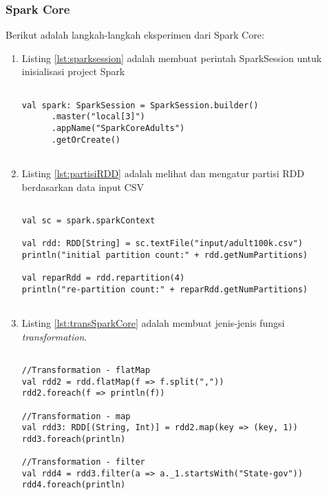 \subsubsection{Spark Core}
\noindent Berikut adalah langkah-langkah eksperimen dari Spark Core:
\begin{enumerate}

\item Listing \ref{lst:sparksession} adalah membuat perintah SparkSession untuk inisialisasi project Spark
\begin{lstlisting}[basicstyle=\ttfamily, frame=single,
	columns=fullflexible, keepspaces=true, breaklines=true, label=lst:sparksession, caption=Membuat SparkSession]

val spark: SparkSession = SparkSession.builder()
      .master("local[3]")
      .appName("SparkCoreAdults")
      .getOrCreate()	
      
\end{lstlisting}

\item Listing \ref{lst:partisiRDD} adalah melihat dan mengatur partisi RDD berdasarkan data input CSV 
\begin{lstlisting}[basicstyle=\ttfamily, frame=single,
	columns=fullflexible, keepspaces=true, breaklines=true, label=lst:partisiRDD, caption=Melihat dan Mengatur Partisi RDD]
	
val sc = spark.sparkContext

val rdd: RDD[String] = sc.textFile("input/adult100k.csv")
println("initial partition count:" + rdd.getNumPartitions)

val reparRdd = rdd.repartition(4)
println("re-partition count:" + reparRdd.getNumPartitions)	
	
\end{lstlisting}

\item Listing \ref{lst:transSparkCore} adalah membuat jenis-jenis fungsi \textit{transformation}.
\begin{lstlisting}[basicstyle=\ttfamily, frame=single,
	columns=fullflexible, keepspaces=true, breaklines=true, label=lst:transSparkCore, caption=Membuat Fungsi Transformation]
	
//Transformation - flatMap
val rdd2 = rdd.flatMap(f => f.split(","))
rdd2.foreach(f => println(f))

//Transformation - map
val rdd3: RDD[(String, Int)] = rdd2.map(key => (key, 1))
rdd3.foreach(println)

//Transformation - filter
val rdd4 = rdd3.filter(a => a._1.startsWith("State-gov"))
rdd4.foreach(println)


\end{lstlisting}
\end{enumerate}

